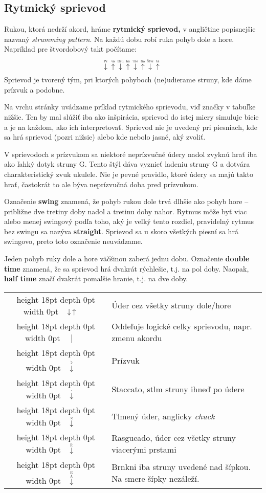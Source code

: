 \subsection*{Rytmický sprievod}

Rukou, ktorá nedrží akord, hráme \textbf{rytmický sprievod,} v angličtine popisnejšie nazvaný
\emph{strumming pattern}. Na každú dobu robí ruka pohyb dole a hore. Napríklad pre štvordobový
takt počítame:
{\larger$$
\PluckDown{Pr}\ \PluckUp{vá}\ \PluckDown{Dru}\ \PluckUp{há}\ 
\PluckDown{Tre}\ \PluckUp{tia}\ \PluckDown{Štvr}\ \PluckUp{tá}\ 
$$}%
Sprievod je tvorený tým, pri ktorých pohyboch (ne)udierame struny, kde dáme prízvuk a podobne.

Na vrchu stránky uvádzame príklad rytmického sprievodu, viď značky v tabuľke nižšie.
Ten by mal slúžiť iba ako inšpirácia, sprievod do istej miery simuluje bicie a je na každom, ako ich
interpretovať. Sprievod nie je uvedený pri piesniach, kde sa hrá \uv{štandardný} sprievod (pozri nižsie)
alebo kde nebolo jasné, aký zvoliť.

V sprievodoch s prízvukom sa niektoré neprízvučné údery nadol zvyknú hrať iba ako ľahký dotyk
struny G. Tento štýl dáva vyznieť ladeniu struny G a dotvára charakteristický zvuk ukulele.
Nie je pevné pravidlo, ktoré údery sa majú takto hrať, častokrát to ale býva neprízvučná doba pred
prízvukom.

Označenie \textbf{swing} znamená, že pohyb rukou dole trvá dlhšie ako pohyb hore -- približne
dve tretiny doby nadol a tretinu doby nahor. Rytmus môže byť viac alebo menej swingový podľa toho,
aký je veľký tento rozdiel, pravidelný rytmus bez swingu sa nazýva \textbf{straight}. Sprievod
sa u skoro všetkých piesní sa hrá swingovo, preto toto označenie neuvádzame.

Jeden pohyb ruky dole a hore väčšinou zaberá jednu dobu. Označenie \textbf{double time} znamená,
že sa sprievod hrá dvakrát rýchlešie, t.j. na pol doby. Naopak, \textbf{half time} značí dvakrát
pomalšie hranie, t.j. na dve doby.

\medskip

\def\mystrut{\vrule height 18pt depth 0pt width 0pt}
\begin{tabularx}{\linewidth}{|c X|}
    \hline
    \mystrut \ \  $\Down\Up$ \ \  & Úder cez všetky struny dole/hore \\
    \mystrut \ \  $\hspace{3pt}\big|\hspace{3pt}$ \ \  & Oddeľuje logické celky sprievodu, napr. zmenu akordu \\
    \mystrut \ \  $\AccentDown$ \ \  & Prízvuk \\
    \mystrut \ \  $\StaccatoDown$ \ \  & Staccato, stlm struny ihneď po údere \\
    \mystrut \ \  $\ChuckDown$ \ \  & Tlmený úder, anglicky \textit{chuck} \\
    \mystrut \ \  $\PluckDown{R}$ \ \  & Rasgueado, \uv{vejárovitý} úder cez všetky struny viacerými prstami \\
    \mystrut \ \  $\PluckDown{E \\ A}$ \ \  & Brnkni iba struny uvedené nad šípkou. Na smere šípky nezáleží. \\
    \hline
\end{tabularx}


